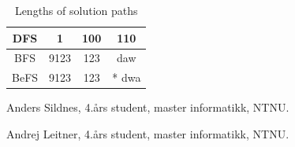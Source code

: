 \documentclass[journal]{IEEEtran}
\begin{document}
\begin{table}[!t]
\renewcommand{\arraystretch}{1.3}
\caption{Lengths of solution paths}
\label{table_example}
\centering
\begin{tabular}{|c|ccc|}
\hline
DFS & 1 & 100 & 110 \\
\hline
BFS & 9123 & 123 & daw \\
\hline
BeFS & 9123 & 123 &* dwa \\
\hline
\end{tabular}
\end{table}


\begin{IEEEbiographynophoto}{Anders Sildnes,}
    4.års student, master informatikk, NTNU.\
\end{IEEEbiographynophoto}
\begin{IEEEbiographynophoto}{Andrej Leitner,}
    4.års student, master informatikk, NTNU.\
\end{IEEEbiographynophoto}

    
%
%
%
%
%
% 
\end{document}
